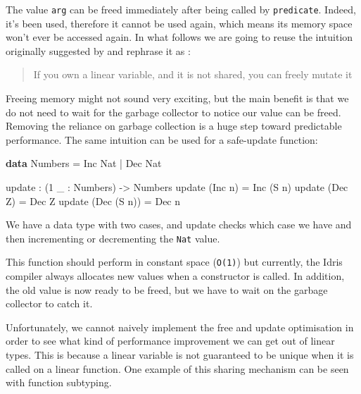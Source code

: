 \documentclass[
]{article}
\newenvironment{Shaded}{}{}
\newcommand{\DataTypeTok}[1]{\textcolor[rgb]{0.56,0.13,0.00}{#1}}
\newcommand{\DecValTok}[1]{\textcolor[rgb]{0.25,0.63,0.44}{#1}}
\newcommand{\KeywordTok}[1]{\textcolor[rgb]{0.00,0.44,0.13}{\textbf{#1}}}
\newcommand{\NormalTok}[1]{#1}
\newcommand{\OperatorTok}[1]{\textcolor[rgb]{0.40,0.40,0.40}{#1}}
\newcommand{\OtherTok}[1]{\textcolor[rgb]{0.00,0.44,0.13}{#1}}
\begin{document}
The value \texttt{arg} can be freed immediately after being called by
\texttt{predicate}. Indeed, it's been used, therefore it cannot be used
again, which means its memory space won't ever be accessed again. In
what follows we are going to reuse the intuition originally suggested by
\cite{once_upon_a_type}\cite{linear_types_update}\cite{linear_use} and
rephrase it as :

\begin{quote}
If you own a linear variable, and it is not shared, you can freely
mutate it
\end{quote}

Freeing memory might not sound very exciting, but the main benefit is
that we do not need to wait for the garbage collector to notice our
value can be freed. Removing the reliance on garbage collection is a
huge step toward predictable performance. The same intuition can be used
for a safe-update function:

\begin{Shaded}
\begin{Highlighting}[]
\KeywordTok{data} \DataTypeTok{Numbers} \OtherTok{=} \DataTypeTok{Inc} \DataTypeTok{Nat} \OperatorTok{|} \DataTypeTok{Dec} \DataTypeTok{Nat}

\NormalTok{update }\OperatorTok{:}\NormalTok{ (}\DecValTok{1}\NormalTok{ \_ }\OperatorTok{:} \DataTypeTok{Numbers}\NormalTok{) }\OtherTok{{-}\textgreater{}} \DataTypeTok{Numbers}
\NormalTok{update (}\DataTypeTok{Inc}\NormalTok{ n) }\OtherTok{=} \DataTypeTok{Inc}\NormalTok{ (}\DataTypeTok{S}\NormalTok{ n)}
\NormalTok{update (}\DataTypeTok{Dec} \DataTypeTok{Z}\NormalTok{) }\OtherTok{=} \DataTypeTok{Dec} \DataTypeTok{Z}
\NormalTok{update (}\DataTypeTok{Dec}\NormalTok{ (}\DataTypeTok{S}\NormalTok{ n)) }\OtherTok{=} \DataTypeTok{Dec}\NormalTok{ n}
\end{Highlighting}
\end{Shaded}

We have a data type with two cases, and update checks which case we have
and then incrementing or decrementing the \texttt{Nat} value.

This function should perform in constant space (\texttt{O(1)}) but
currently, the Idris compiler always allocates new values when a
constructor is called. In addition, the old value is now ready to be
freed, but we have to wait on the garbage collector to catch it.

Unfortunately, we cannot naively implement the free and update
optimisation in order to see what kind of performance improvement we can
get out of linear types. This is because a linear variable is not
guaranteed to be unique when it is called on a linear function. One
example of this sharing mechanism can be seen with function subtyping.
\end{document}
